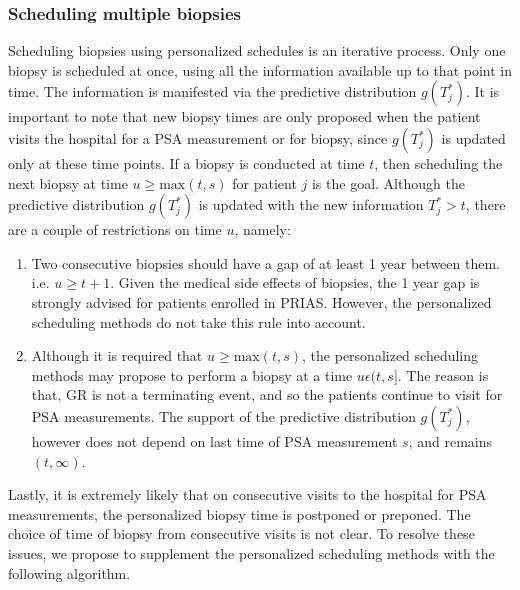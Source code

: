 \subsubsection{Scheduling multiple biopsies}
\label{subsubsec : pers_sched_algorithm}
Scheduling biopsies using personalized schedules is an iterative process. Only one biopsy is scheduled at once, using all the information available up to that point in time. The information is manifested via the predictive distribution $g(T^*_j)$. It is important to note that new biopsy times are only proposed when the patient visits the hospital for a PSA measurement or for biopsy, since $g(T^*_j)$ is updated only at these time points. If a biopsy is conducted at time $t$, then scheduling the next biopsy at time $u \geq \text{max}(t,s)$ for patient $j$ is the goal. Although the predictive distribution $g(T^*_j)$ is updated with the new information $T^*_j > t$, there are a couple of restrictions on time $u$, namely:

\begin{enumerate}
\item Two consecutive biopsies should have a gap of at least 1 year between them. i.e. $u \geq t + 1$. Given the medical side effects of biopsies, the 1 year gap is strongly advised for patients enrolled in PRIAS. However, the personalized scheduling methods do not take this rule into account.
\item Although it is required that $u \geq \text{max}(t,s)$, the personalized scheduling methods may propose to perform a biopsy at a time $u \epsilon (t, s]$. The reason is that, GR is not a terminating event, and so the patients continue to visit for PSA measurements. The support of the predictive distribution $g(T^*_j)$, however does not depend on last time of PSA measurement $s$, and remains $(t, \infty)$.
\end{enumerate}
 
Lastly, it is extremely likely that on consecutive visits to the hospital for PSA measurements, the personalized biopsy time is postponed or preponed. The choice of time of biopsy from consecutive visits is not clear. To resolve these issues, we propose to supplement the personalized scheduling methods with the following algorithm.


